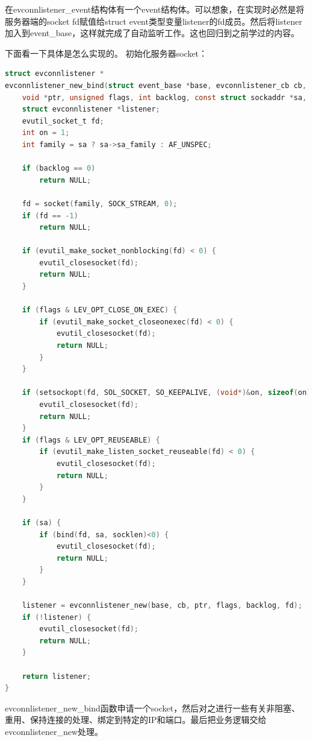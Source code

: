\documentclass[11pt,a4paper]{article}
\begin{document}
在evconnlistener\_event结构体有一个event结构体。可以想象，在实现时必然是将服务器端的socket fd赋值给struct event类型变量listener的fd成员。然后将listener加入到event\_base，这样就完成了自动监听工作。这也回归到之前学过的内容。

下面看一下具体是怎么实现的。
初始化服务器socket：

\begin{lstlisting}[language=C]
struct evconnlistener *
evconnlistener_new_bind(struct event_base *base, evconnlistener_cb cb,
    void *ptr, unsigned flags, int backlog, const struct sockaddr *sa, int socklen) {
	struct evconnlistener *listener;
	evutil_socket_t fd;
	int on = 1;
	int family = sa ? sa->sa_family : AF_UNSPEC;

	if (backlog == 0)
		return NULL;

	fd = socket(family, SOCK_STREAM, 0);
	if (fd == -1)
		return NULL;

	if (evutil_make_socket_nonblocking(fd) < 0) {
		evutil_closesocket(fd);
		return NULL;
	}

	if (flags & LEV_OPT_CLOSE_ON_EXEC) {
		if (evutil_make_socket_closeonexec(fd) < 0) {
			evutil_closesocket(fd);
			return NULL;
		}
	}

	if (setsockopt(fd, SOL_SOCKET, SO_KEEPALIVE, (void*)&on, sizeof(on))<0) {
		evutil_closesocket(fd);
		return NULL;
	}
	if (flags & LEV_OPT_REUSEABLE) {
		if (evutil_make_listen_socket_reuseable(fd) < 0) {
			evutil_closesocket(fd);
			return NULL;
		}
	}

	if (sa) {
		if (bind(fd, sa, socklen)<0) {
			evutil_closesocket(fd);
			return NULL;
		}
	}

	listener = evconnlistener_new(base, cb, ptr, flags, backlog, fd);
	if (!listener) {
		evutil_closesocket(fd);
		return NULL;
	}

	return listener;
}
\end{lstlisting}
 evconnlistener\_new\_bind函数申请一个socket，然后对之进行一些有关非阻塞、重用、保持连接的处理、绑定到特定的IP和端口。最后把业务逻辑交给evconnlistener\_new处理。
\end{document}
